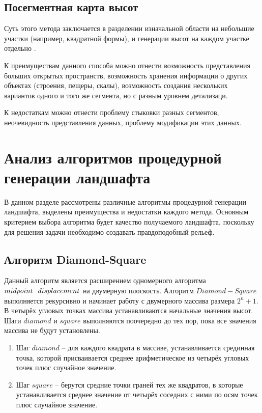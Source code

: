\subsection{Посегментная карта высот}

Суть этого метода заключается в разделении изначальной области на
небольшие участки (например, квадратной формы), и генерации высот на
каждом участке отдельно \cite{datalandsseg}.

К преимуществам данного способа можно отнести возможность представления больших открытых пространств, возможность хранения информации о других объектах (строения, пещеры, скалы), возможность создания нескольких вариантов одного и того же сегмента, но с разным уровнем детализаци.

К недостаткам можно отнести проблему стыковки разных сегментов, неочевидность представления данных, проблему модификации этих данных.

\section{Анализ алгоритмов процедурной генерации ландшафта}

В данном разделе рассмотрены различные алгоритмы процедурной генерации ландшафта, выделены преимущества и недостатки каждого метода. Основным критерием выбора алгоритма будет качество получаемого ландшафта, поскольку для решения задачи необходимо создавать правдоподобный рельеф.

\subsection{Алгоритм Diamond-Square}

Данный алгоритм является расширением одномерного алгоритма $midpoint \hspace{0.25cm} displacement$ \cite{midpdipl} на двумерную плоскость. Алгоритм $Diamond-Square$ \cite{diasqu} выполняется рекурсивно и начинает работу с двумерного массива размера $2^n + 1$. В четырёх угловых точках массива устанавливаются начальные значения высот. Шаги $diamond$ и $square$ выполняются поочередно до тех пор, пока все значения массива не будут установлены.

\begin{enumerate}[label={\arabic*)}]
    \item Шаг $diamond$ -- для каждого квадрата в массиве, устанавливается срединная точка, которой присваивается среднее арифметическое из четырёх угловых точек плюс случайное значение.
	\item Шаг $square$ -- берутся средние точки граней тех же квадратов, в которые устанавливается среднее значение от четырёх соседних с ними по осям точек плюс случайное значение.
\end{enumerate}

